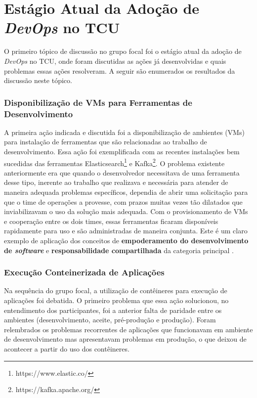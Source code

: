 \section{Estágio Atual da Adoção de \emph{DevOps} no \acrshort{TCU}}\label{secao_resultados_grupo_1}

O primeiro tópico de discussão no grupo focal foi o estágio atual da adoção de
{\it DevOps} no \acrshort{TCU}, onde foram discutidas as ações já desenvolvidas
e quais problemas essas ações resolveram. A seguir são enumerados os
resultados da discussão neste tópico.

\subsubsection{Disponibilização de \acrshort{VM}s para Ferramentas de Desenvolvimento}

A primeira ação indicada e discutida foi a disponibilização de ambientes (\acrshort{VM}s)
para instalação de ferramentas que são relacionadas ao trabalho de
desenvolvimento. Essa ação foi exemplificada com as recentes instalações bem
sucedidas das ferramentas Elasticsearch\footnote{https://www.elastic.co/} e Kafka\footnote{https://kafka.apache.org/}.
O problema existente anteriormente era que quando o desenvolvedor necessitava de
uma ferramenta desse tipo, inerente ao trabalho que realizava e necessária para
atender de maneira adequada problemas específicos, dependia de abrir uma
solicitação para que o time de operações a provesse, com prazos muitas vezes
tão dilatados que inviabilizavam o uso da solução mais adequada. Com o
provisionamento de \acrshort{VM}s e cooperação entre os dois times, essas
ferramentas ficaram disponíveis rapidamente para uso e são administradas de
maneira conjunta. Este é um claro exemplo de aplicação dos conceitos de
{\bf empoderamento do desenvolvimento de \emph{software}} e {\bf responsabilidade
compartilhada} da categoria principal .

\subsubsection{Execução Conteinerizada de Aplicações}

Na sequência do grupo focal, a utilização de contêineres para execução de
aplicações foi debatida. O primeiro problema que essa ação solucionou, no
entendimento dos participantes, foi a anterior falta de paridade entre os
ambientes (desenvolvimento, aceite, pré-produção e produção). Foram relembrados
os problemas recorrentes de aplicações que funcionavam em ambiente de
desenvolvimento mas apresentavam problemas em produção, o que deixou de
acontecer a partir do uso dos contêineres.

